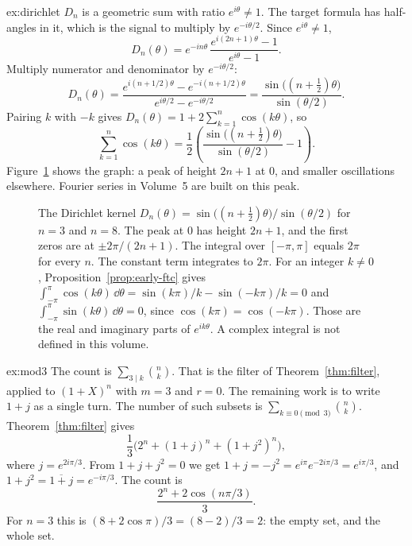 \begin{solution}{ex:dirichlet}
\idea $D_n$ is a geometric sum with ratio $e^{i\theta}\ne1$. The target formula has half-angles in it, which is the signal to multiply by $e^{-i\theta/2}$.
\writeup Since $e^{i\theta}\ne1$,
\[
D_n(\theta)=e^{-in\theta}\,\frac{e^{i(2n+1)\theta}-1}{e^{i\theta}-1}.
\]
Multiply numerator and denominator by $e^{-i\theta/2}$:
\[
D_n(\theta)=\frac{e^{i(n+1/2)\theta}-e^{-i(n+1/2)\theta}}{e^{i\theta/2}-e^{-i\theta/2}}=\frac{\sin\bigl((n+\tfrac12)\theta\bigr)}{\sin(\theta/2)}.
\]
Pairing $k$ with $-k$ gives $D_n(\theta)=1+2\sum_{k=1}^n\cos(k\theta)$, so
\[
\sum_{k=1}^n\cos(k\theta)=\frac12\left(\frac{\sin\bigl((n+\tfrac12)\theta\bigr)}{\sin(\theta/2)}-1\right).
\]
Figure~\ref{fig:dirichlet} shows the graph: a peak of height $2n+1$ at $0$, and smaller oscillations elsewhere. Fourier series in Volume~5 are built on this peak.
\end{solution}

\begin{figure}[ht]
\centering
{}
\caption{The Dirichlet kernel $D_n(\theta)=\sin\bigl((n+\tfrac12)\theta\bigr)/\sin(\theta/2)$ for $n=3$ and $n=8$. The peak at $0$ has height $2n+1$, and the first zeros are at $\pm2\pi/(2n+1)$. The integral over $[-\pi,\pi]$ equals $2\pi$ for every $n$. The constant term integrates to $2\pi$. For an integer $k\ne0$, Proposition~\ref{prop:early-ftc} gives $\int_{-\pi}^{\pi}\cos(k\theta)\,\dd\theta=\sin(k\pi)/k-\sin(-k\pi)/k=0$ and $\int_{-\pi}^{\pi}\sin(k\theta)\,\dd\theta=0$, since $\cos(k\pi)=\cos(-k\pi)$. Those are the real and imaginary parts of $e^{ik\theta}$. A complex integral is not defined in this volume.}
\label{fig:dirichlet}
\end{figure}

\begin{solution}{ex:mod3}
\idea The count is $\sum_{3\mid k}\binom nk$. That is the filter of Theorem~\ref{thm:filter}, applied to $(1+X)^n$ with $m=3$ and $r=0$. The remaining work is to write $1+j$ as a single turn.
\writeup The number of such subsets is $\sum_{k\equiv0\pmod3}\binom nk$. Theorem~\ref{thm:filter} gives
\[
\frac13\bigl(2^n+(1+j)^n+(1+j^2)^n\bigr),
\]
where $j=e^{2i\pi/3}$. From $1+j+j^2=0$ we get $1+j=-j^2=e^{i\pi}e^{-2i\pi/3}=e^{i\pi/3}$, and $1+j^2=\overline{1+j}=e^{-i\pi/3}$. The count is
\[
\frac{2^n+2\cos(n\pi/3)}3.
\]
For $n=3$ this is $(8+2\cos\pi)/3=(8-2)/3=2$: the empty set, and the whole set.
\end{solution}

